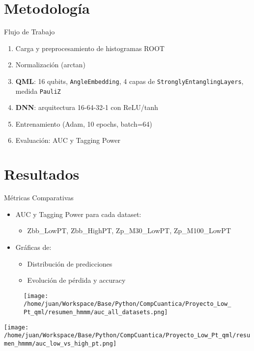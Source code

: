 \documentclass{beamer}
\begin{document}
\section{Metodología}
\begin{frame}{Flujo de Trabajo}
  \begin{enumerate}
    \item Carga y preprocesamiento de histogramas ROOT
    \item Normalización (arctan)
    \item \textbf{QML}: 16 qubits, \texttt{AngleEmbedding}, 4 capas de \texttt{StronglyEntanglingLayers}, medida \texttt{PauliZ}
    \item \textbf{DNN}: arquitectura 16-64-32-1 con ReLU/tanh
    \item Entrenamiento (Adam, 10 epochs, batch=64)
    \item Evaluación: AUC y Tagging Power
  \end{enumerate}
\end{frame}

\section{Resultados}
\begin{frame}{Métricas Comparativas}
  \begin{itemize}
    \item AUC y Tagging Power para cada dataset:
      \begin{itemize}
        \item Zbb\_LowPT, Zbb\_HighPT, Zp\_M30\_LowPT, Zp\_M100\_LowPT
      \end{itemize}
    \item Gráficas de:
      \begin{itemize}
        \item Distribución de predicciones
        \item Evolución de pérdida y accuracy
      \end{itemize}
  \end{itemize}
  \vspace{1em}
  \begin{figure}
    \centering
    \texttt{[image: /home/juan/Workspace/Base/Python/CompCuantica/Proyecto\_Low\_Pt\_qml/resumen\_hmmm/auc\_all\_datasets.png]}
  \end{figure}
\end{frame}

\begin{frame}
  \texttt{[image: /home/juan/Workspace/Base/Python/CompCuantica/Proyecto\_Low\_Pt\_qml/resumen\_hmmm/auc\_low\_vs\_high\_pt.png]}
\end{frame}
\end{document}
